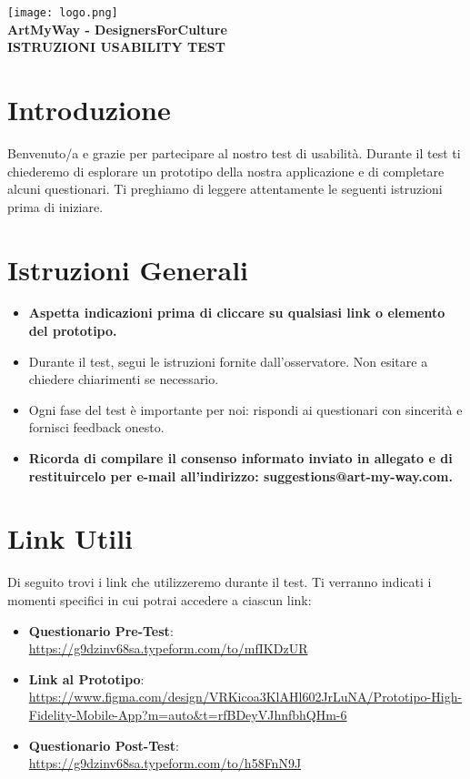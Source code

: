 \documentclass{article}
\begin{document}
\begin{center}
    \texttt{[image: logo.png]} \\[1em]
    {\LARGE \textbf{ArtMyWay - DesignersForCulture}} \\[0.5em]
    {\Large \textbf{ISTRUZIONI USABILITY TEST}} \\[1.5em]
\end{center}

\section*{Introduzione}
Benvenuto/a e grazie per partecipare al nostro test di usabilit\`a. Durante il test ti chiederemo di esplorare un prototipo della nostra applicazione e di completare alcuni questionari.
Ti preghiamo di leggere attentamente le seguenti istruzioni prima di iniziare.

\section*{Istruzioni Generali}
\begin{itemize}
    \item \textbf{Aspetta indicazioni prima di cliccare su qualsiasi link o elemento del prototipo.}
    \item Durante il test, segui le istruzioni fornite dall'osservatore. Non esitare a chiedere chiarimenti se necessario.
    \item Ogni fase del test \`e importante per noi: rispondi ai questionari con sincerit\`a e fornisci feedback onesto.
    \item \textbf{Ricorda di compilare il consenso informato inviato in allegato e di restituircelo per e-mail all'indirizzo: suggestions@art-my-way.com.}
\end{itemize}

\section*{Link Utili}
Di seguito trovi i link che utilizzeremo durante il test. Ti verranno indicati i momenti specifici in cui potrai accedere a ciascun link:

\begin{itemize}
    \item \textbf{Questionario Pre-Test}: \\ \url{https://g9dzinv68sa.typeform.com/to/mfIKDzUR}
    \item \textbf{Link al Prototipo}: \\ \url{https://www.figma.com/design/VRKicoa3KlAHl602JrLuNA/Prototipo-High-Fidelity-Mobile-App?m=auto&t=rfBDeyVJhnfbhQHm-6}
    \item \textbf{Questionario Post-Test}: \\ \url{https://g9dzinv68sa.typeform.com/to/h58FnN9J}
\end{itemize}
\end{document}
